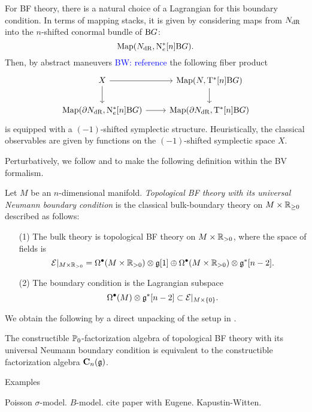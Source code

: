 \documentclass[11pt]{amsart}
\numberwithin{equation}{section}
\def\brian{\textcolor{blue}{BW: }\textcolor{blue}}
\begin{document}
For BF theory, there is a natural choice of a Lagrangian for this boundary condition. 
In terms of mapping stacks, it is given by considering maps from $N_{\rm dR}$ into the $n$-shifted conormal bundle of ${\rm B} G$:
\[
{\rm Map}(N_{\rm dR} , {\rm N}^*_e [n] {\rm B}G) .
\]
Then, by abstract maneuvers \brian{reference} the following fiber product
\[
\begin{tikzcd}
X \ar[r] \ar[d] & {\rm Map} (N , {\rm T}^* [n] {\rm B} G) \ar[d] \\
{\rm Map}(\partial N_{\rm dR} , {\rm N}^*_e  [n] {\rm B}G) \ar[r] & {\rm Map}(\partial N_{\rm dR} , {\rm T}^*[n]  {\rm B}G)
\end{tikzcd}
\]
is equipped with a $(-1)$-shifted symplectic structure. 
Heuristically, the classical observables are given by functions on the $(-1)$-shifted symplectic space $X$.

Perturbatively, we follow \cite{ButsonYoo} and \cite{Eugene} to make the following definition within the BV formalism.

\begin{dfn}
Let $M$ be an $n$-dimensional manifold.
{\em Topological BF theory with its universal Neumann boundary condition} is the classical bulk-boundary theory on $M \times \mathbb R_{\geq 0}$ described as follows:
\begin{itemize}
\item[(1)] 
The bulk theory is topological BF theory on $M \times \mathbb R_{>0}$, where the space of fields is 
\[
\mathcal E|_{M \times \mathbb R_{>0}} = \Omega^{\bullet} (M \times \mathbb R_{>0}) \otimes \mathfrak g [1] \oplus \Omega^{\bullet} (M \times \mathbb R_{>0}) \otimes \mathfrak g^* [n-2] .
\]
\item[(2)] 
The boundary condition is the Lagrangian subspace
\[
\Omega^{\bullet} (M) \otimes \mathfrak g^* [n-2] \subset \mathcal E|_{M \times \{0\}} .
\]
\end{itemize}
\end{dfn}

We obtain the following by a direct unpacking of the setup in \cite{Eugene}. 

\begin{prp}
The constructible $\mathbb P_0$-factorization algebra of topological BF theory with its universal Neumann boundary condition is equivalent to the constructible factorization algebra $\mathbf C_n(\mathfrak g)$. 
\end{prp}

\begin{rmk} Examples

Poisson $\sigma$-model. 
$B$-model. 
cite paper with Eugene.
Kapustin-Witten. 
\end{rmk}
\end{document}

